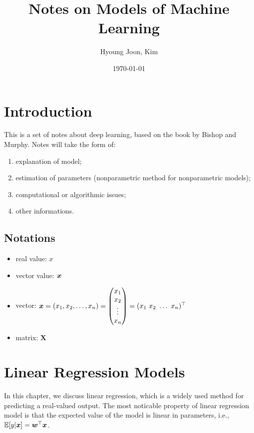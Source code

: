 \documentclass{article}
\title{Notes on Models of Machine Learning}
\author{Hyoung Joon, Kim}
\date{\today}
\begin{document}
\maketitle
\tableofcontents
\newpage

\section{Introduction}
This is a set of notes about deep learning, based on the book by Bishop and Murphy.
Notes will take the form of:
\begin{enumerate}
    \item explanation of model;
    \item estimation of parameters (nonparametric method for nonparametric models);
    \item computational or algorithmic issues;
    \item other informations.
\end{enumerate}

    \subsection{Notations}
        \begin{itemize}
            \item real value: $x$
            \item vector value: $\boldsymbol{x}$
            \item vector: $\boldsymbol{x} = (x_1, x_2, \ldots, x_n)
            = 
            \begin{pmatrix}
                x_1 \\
                x_2 \\
                \vdots \\
                x_n    
            \end{pmatrix}
            =
            (x_1\ x_2\ \ldots\ x_n)^\top
            $
            \item matrix: $\textbf{X}$
        \end{itemize}

\section{Linear Regression Models}
    In this chapter, we discuss linear regression, which is a widely used method for predicting a real-valued output.
    The most noticable property of linear regression model is that the expected value of the model is linear in parameters,
    i.e., $\mathbb{E}[y|\boldsymbol{x}]=\boldsymbol{w}^{\top}\boldsymbol{x}$.
\end{document}
